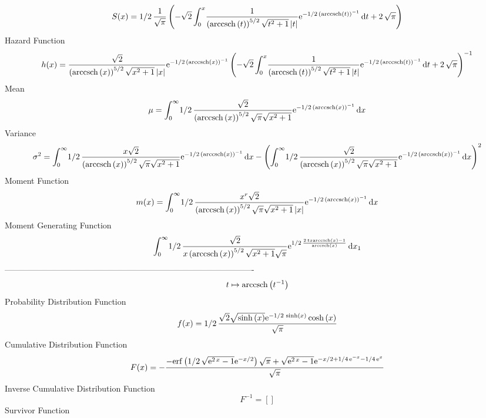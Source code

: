 \documentclass[12pt]{article}
\begin{document}
 $$ S(x)=1/2\,{\frac {1}{\sqrt {\pi}} \left( -\sqrt {2}\int_{0}^{x}\!{\frac {1
}{ \left( {\rm arccsch} \left(t\right) \right) ^{5/2}\sqrt {{t}^{2}+1}
 \left| t \right| }{{\rm e}^{-1/2\, \left( {\rm arccsch} \left(t
\right) \right) ^{-1}}}}\,{\rm d}t+2\,\sqrt {\pi} \right) }
$$ Hazard Function 
 $$ h(x)={\frac {\sqrt {2}}{ \left( {\rm arccsch} \left(x\right) \right) ^{5/2}
\sqrt {{x}^{2}+1} \left| x \right| }{{\rm e}^{-1/2\, \left( 
{\rm arccsch} \left(x\right) \right) ^{-1}}} \left( -\sqrt {2}\int_{0}
^{x}\!{\frac {1}{ \left( {\rm arccsch} \left(t\right) \right) ^{5/2}
\sqrt {{t}^{2}+1} \left| t \right| }{{\rm e}^{-1/2\, \left( 
{\rm arccsch} \left(t\right) \right) ^{-1}}}}\,{\rm d}t+2\,\sqrt {\pi}
 \right) ^{-1}}
$$Mean 
 $$ \mu=\int_{0}^{\infty }\!1/2\,{\frac {\sqrt {2}}{ \left( {\rm arccsch} 
\left(x\right) \right) ^{5/2}\sqrt {\pi}\sqrt {{x}^{2}+1}}{{\rm e}^{-1
/2\, \left( {\rm arccsch} \left(x\right) \right) ^{-1}}}}\,{\rm d}x
$$ Variance 
 $$ \sigma^2 = \int_{0}^{\infty }\!1/2\,{\frac {x\sqrt {2}}{ \left( {\rm arccsch} 
\left(x\right) \right) ^{5/2}\sqrt {\pi}\sqrt {{x}^{2}+1}}{{\rm e}^{-1
/2\, \left( {\rm arccsch} \left(x\right) \right) ^{-1}}}}\,{\rm d}x-
 \left( \int_{0}^{\infty }\!1/2\,{\frac {\sqrt {2}}{ \left( 
{\rm arccsch} \left(x\right) \right) ^{5/2}\sqrt {\pi}\sqrt {{x}^{2}+1
}}{{\rm e}^{-1/2\, \left( {\rm arccsch} \left(x\right) \right) ^{-1}}}
}\,{\rm d}x \right) ^{2}
$$Moment Function 
 $$ m(x) = \int_{0}^{\infty }\!1/2\,{\frac {{x}^{r}\sqrt {2}}{ \left( 
{\rm arccsch} \left(x\right) \right) ^{5/2}\sqrt {\pi}\sqrt {{x}^{2}+1
} \left| x \right| }{{\rm e}^{-1/2\, \left( {\rm arccsch} \left(x
\right) \right) ^{-1}}}}\,{\rm d}x
$$ Moment Generating Function 
 $$\int_{0}^{\infty }\!1/2\,{\frac {\sqrt {2}}{x \left( {\rm arccsch} 
\left(x\right) \right) ^{5/2}\sqrt {{x}^{2}+1}\sqrt {\pi}}{{\rm e}^{1/
2\,{\frac {2\,tx{\rm arccsch} \left(x\right)-1}{{\rm arccsch} \left(x
\right)}}}}}\,{\rm d}x_{{1}}
$$-------------------------------------------------------------------------------------------  \\$$t\mapsto {\rm arccsch} \left({t}^{-1}\right)
$$Probability Distribution Function 
$$  f(x)=1/2\,{\frac {\sqrt {2}\sqrt {\sinh \left( x \right) }{{\rm e}^{-1/2\,
\sinh \left( x \right) }}\cosh \left( x \right) }{\sqrt {\pi}}}
$$Cumulative Distribution Function  
 $$F(x)=-{\frac {-{\rm erf} \left(1/2\,\sqrt {{{\rm e}^{2\,x}}-1}{{\rm e}^{-x/
2}}\right)\sqrt {\pi}+\sqrt {{{\rm e}^{2\,x}}-1}{{\rm e}^{-x/2+1/4\,{
{\rm e}^{-x}}-1/4\,{{\rm e}^{x}}}}}{\sqrt {\pi}}}
$$ Inverse Cumulative Distribution Function 
  $$F^{-1} = []
$$Survivor Function 
\end{document}
